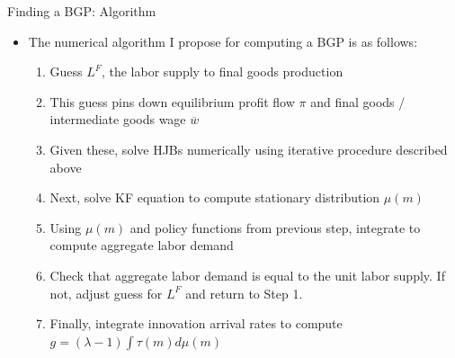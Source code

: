 \documentclass[english,usenames,dvipsnames]{beamer}
\begin{document}
\begin{frame}{Finding a BGP: Algorithm}
\begin{itemize}
	\item The numerical algorithm I propose for computing a BGP is as follows:
	\begin{enumerate}
		\item Guess $L^F$, the labor supply to final goods production
		\item This guess pins down equilibrium profit flow $\pi$ and final goods / intermediate goods wage $\overline{w}$
		\item Given these, solve HJBs numerically using iterative procedure described above
		\item Next, solve KF equation to compute stationary distribution $\mu(m)$
		\item Using $\mu(m)$ and policy functions from previous step, integrate to compute aggregate labor demand 
		\item Check that aggregate labor demand is equal to the unit labor supply. If not, adjust guess for $L^F$ and return to Step 1.
		\item Finally, integrate innovation arrival rates to compute $g = (\lambda-1)\int \tau(m) d\mu(m)$
	\end{enumerate}
\end{itemize}
\end{frame}
\end{document}
